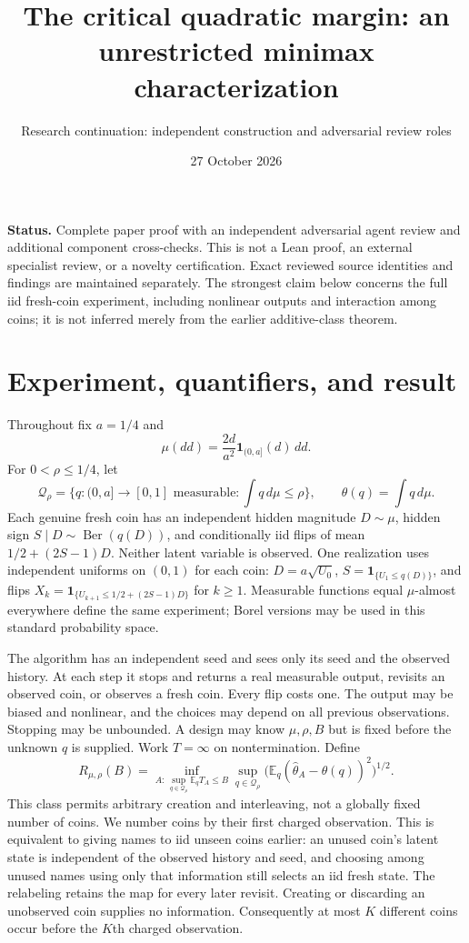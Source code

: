 \documentclass[11pt]{article}
\title{The critical quadratic margin: an unrestricted minimax characterization}
\author{Research continuation: independent construction and adversarial review roles}
\date{27 October 2026}
\newcommand{\E}{\mathbb E}
\newcommand{\ind}{\mathbf1}
\begin{document}
\maketitle

\noindent\textbf{Status.} Complete paper proof with an independent adversarial
agent review and additional component cross-checks. This is not a Lean proof,
an external specialist review, or a novelty certification. Exact reviewed
source identities and findings are maintained separately. The strongest claim below concerns
the full iid fresh-coin experiment, including nonlinear outputs and interaction
among coins; it is not inferred merely from the earlier additive-class theorem.

\section{Experiment, quantifiers, and result}
Throughout fix $a=1/4$ and
\[
 \mu(dd)=\frac{2d}{a^2}\ind_{(0,a]}(d)\,dd.
\]
For $0<\rho\le1/4$, let
\[
 \mathcal Q_\rho=\{q:(0,a]\to[0,1]\text{ measurable}:\int q\,d\mu\le\rho\},
 \qquad \theta(q)=\int q\,d\mu.
\]
Each genuine fresh coin has an independent hidden magnitude $D\sim\mu$,
hidden sign $S\mid D\sim\operatorname{Ber}(q(D))$, and conditionally iid
flips of mean $1/2+(2S-1)D$. Neither latent variable is observed. One realization
uses independent uniforms on $(0,1)$ for each coin: $D=a\sqrt{U_0}$,
$S=\ind_{\{U_1\le q(D)\}}$, and flips
$X_k=\ind_{\{U_{k+1}\le1/2+(2S-1)D\}}$ for $k\ge1$. Measurable functions
equal $\mu$-almost everywhere define the same experiment; Borel versions may
be used in this standard probability space.

The algorithm has an independent seed and sees only its seed and the observed
history. At each step it stops and returns a real measurable output, revisits
an observed coin, or observes a fresh coin. Every flip costs one. The output
may be biased and nonlinear, and the choices may depend on all previous
observations. Stopping may be unbounded. A design may know $\mu,\rho,B$ but is
fixed before the unknown $q$ is supplied. Work $T=\infty$ on nontermination.
Define
\[
 R_{\mu,\rho}(B)=\inf_{A:\,\sup_{q\in\mathcal Q_\rho}\E_qT_A\le B}
       \sup_{q\in\mathcal Q_\rho}\bigl(\E_q(\widehat\theta_A-\theta(q))^2\bigr)^{1/2}.
\]
This class permits arbitrary creation and interleaving, not a globally fixed
number of coins. We number coins by their first charged observation. This
is equivalent to giving names to iid unseen coins earlier: an unused coin's
latent state is independent of the observed history and seed, and choosing
among unused names using only that information still selects an iid fresh
state. The relabeling retains the map for every later revisit. Creating or
discarding an unobserved coin supplies no information. Consequently at most
$K$ different coins occur before the $K$th charged observation.
\end{document}
